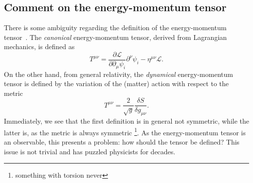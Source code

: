 \subsection{Comment on the energy-momentum tensor}\label{sec:commen-T}
There is some ambiguity regarding the definition of the energy-momentum tensor~\cites{kachelriessQuantumFieldsHubble2018}{chernodubThermalTransportGeometry2021}{vanderwurffMagnetovorticalThermoelectricTransport2019}{forgerCurrentsEnergyMomentumTensor2004}.
The \emph{canonical} energy-momentum tensor, derived from Lagrangian mechanics, is defined as
\begin{equation}
	T^{\mu \nu } = \frac{\partial \mathcal{L}}{\partial \partial _{\mu } \psi_i } \partial ^{\nu } \psi_i - \eta^{\mu \nu } \mathcal{L}.
\end{equation}
On the other hand, from general relativity, the \emph{dynamical} energy-momentum tensor is defined by the variation of the (matter) action with respect to the metric\cite{kachelriessQuantumFieldsHubble2018}
\begin{equation}
	T^{\mu \nu} = \frac{2}{\sqrt{g} } \frac{\delta S}{\delta g_{\mu \nu}}.
\end{equation}
Immediately, we see that the first definition is in general not symmetric, while the latter is, as the metric is always symmetric%
\footnote{something with torsion never}.
As the energy-momentum tensor is an observable, this presents a problem:
how should the tensor be defined?
This issue is not trivial and has puzzled physicists for decades\cite{forgerCurrentsEnergyMomentumTensor2004}.

